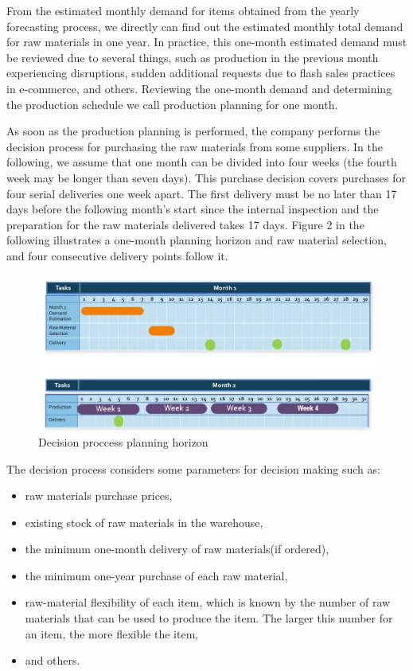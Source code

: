 \documentclass[preprint, 3p,
authoryear]{elsarticle} %
\providecommand{\tightlist}{%
  \setlength{\itemsep}{0pt}\setlength{\parskip}{0pt}}
\begin{document}
From the estimated monthly demand for items obtained from the yearly
forecasting process, we directly can find out the estimated monthly
total demand for raw materials in one year. In practice, this one-month
estimated demand must be reviewed due to several things, such as
production in the previous month experiencing disruptions, sudden
additional requests due to flash sales practices in e-commerce, and
others. Reviewing the one-month demand and determining the production
schedule we call production planning for one month.

As soon as the production planning is performed, the company performs
the decision process for purchasing the raw materials from some
suppliers. In the following, we assume that one month can be divided
into four weeks (the fourth week may be longer than seven days). This
purchase decision covers purchases for four serial deliveries one week
apart. The first delivery must be no later than 17 days before the
following month's start since the internal inspection and the
preparation for the raw materials delivered takes 17 days. Figure 2 in
the following illustrates a one-month planning horizon and raw material
selection, and four consecutive delivery points follow it.

\begin{figure}

{\centering \includegraphics[width=0.8\linewidth]{Supply Cycle 2} 

}

\caption{Decision proccess planning horizon}\label{fig:unnamed-chunk-2}
\end{figure}

The decision process considers some parameters for decision making such
as:

\begin{itemize}
\tightlist
\item
  raw materials purchase prices,
\item
  existing stock of raw materials in the warehouse,
\item
  the minimum one-month delivery of raw materials(if ordered),
\item
  the minimum one-year purchase of each raw material,
\item
  raw-material flexibility of each item, which is known by the number of
  raw materials that can be used to produce the item. The larger this
  number for an item, the more flexible the item,
\item
  and others.
\end{itemize}
\end{document}

